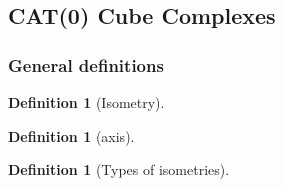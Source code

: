 \documentclass{article}
\theoremstyle{mystyle}
\newtheorem{defn}[thm]{Definition}
\theoremstyle{remark}
\begin{document}



\subsection{CAT(0) Cube Complexes}
\subsubsection {General definitions}
\begin{defn}
    [Isometry]
\end{defn}
\begin{defn}
    [axis]
\end{defn}
\begin{defn}
    [Types of isometries]
\end{defn}
\end{document}
